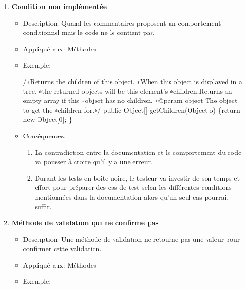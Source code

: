 \begin{enumerate}
    

\item \textbf {Condition non implémentée}
\begin{itemize}
    \item Description: Quand les commentaires proposent un comportement conditionnel mais le code ne le contient pas.
\item Appliqué aux: Méthodes
\item Exemple:
\begin{framed}
{\selectfont
/∗Returns the children of this object.\newline
∗When this object is displayed in a tree,\newline
∗the returned objects will be this element’s\newline
∗children.Returns an empty array if this\newline
∗object has no children.\newline
∗@param object The object to get the\newline
∗children for.∗/\newline
public Object[] getChildren(Object o)\newline
\{return new Object[0]; \}
}

\end{framed}

\item Conséquences: \\
\begin{enumerate}
    \item La contradiction entre la documentation et le comportement du code va pousser à croire qu’il y a une erreur.
     \item Durant les tests en boite noire, le testeur va investir de son temps et effort pour préparer des cas de test selon les différentes conditions mentionnées dans la documentation alors qu’un seul cas pourrait suffir.

\end{enumerate}

\end{itemize}

\item \textbf {Méthode de validation qui ne confirme pas}
\begin{itemize}
\item Description: Une méthode de validation ne retourne pas une valeur pour confirmer cette validation.
\item Appliqué aux: Méthodes
\item Exemple: 
\begin{framed}



\end{framed}
\end{itemize}
\end{enumerate}
